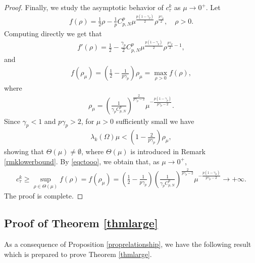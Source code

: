\documentclass[10pt,a4paper]{article}
\theoremstyle{definition} \theoremstyle{remark}
\numberwithin{equation}{section}
\newcommand{\la}{\lambda}
\newcommand{\ga}{\gamma}
\begin{document}
\begin{proof}
    Finally, we study the asymptotic behavior of $c_\tau^k$ as $\mu \to 0^+$. Let
    \begin{align*}
    	f(\rho) = \frac12 \rho - \frac1p C_{p,N}^p \mu^{\frac{p(1-\ga_p)}{2}}\rho ^{\frac{p\ga_p}{2}}, \quad \rho > 0.
    \end{align*}
    Computing directly we get that
    \begin{align*}
    	f'(\rho) = \frac12 - \frac{\ga_p}2 C_{p,N}^p \mu^{\frac{p(1-\ga_p)}{2}}\rho ^{\frac{p\ga_p}{2}-1},
    \end{align*}
    and
    \begin{align*}
    	f(\rho_\mu) = \left( \frac12 - \frac{1}{p\ga_p}\right) \rho_\mu = \max_{\rho > 0}f(\rho),
    \end{align*}
    where
    \begin{align*}
    	\rho_\mu = \left( \frac{1}{\ga_pC_{p,N}^p}\right) ^{\frac{2}{p\ga_p-2}}\mu^{-\frac{p(1-\ga_p)}{p\ga_p-2}}.
    \end{align*}
    Since $\ga_p < 1$ and $p\ga_p > 2$, for $\mu > 0$ sufficiently small we have
    \begin{align*}
    	\la_k(\Omega)\mu < \left( 1 - \frac{2}{p\ga_p}\right) \rho_\mu,
    \end{align*}
    showing that $\Theta(\mu) \neq \emptyset$, where $\Theta(\mu)$ is introduced in Remark \ref{rmklowerbound}. By \eqref{eqctooo}, we obtain that, as $\mu \to 0^+$,
    \begin{align*}
        c_\tau^k \geq \sup_{\rho \in \Theta(\mu)}f(\rho) = f(\rho_\mu) = \left( \frac12 - \frac{1}{p\ga_p}\right)\left( \frac{1}{\ga_pC_{p,N}^p}\right) ^{\frac{2}{p\ga_p-2}}\mu^{-\frac{p(1-\ga_p)}{p\ga_p-2}} \to +\infty.
    \end{align*}
    The proof is complete.
\end{proof}

\subsection{Proof of Theorem \ref{thmlarge}}

As a consequence of Proposition \ref{proprelationship}, we have the following result which is prepared to prove Theorem \ref{thmlarge}.
\end{document}
